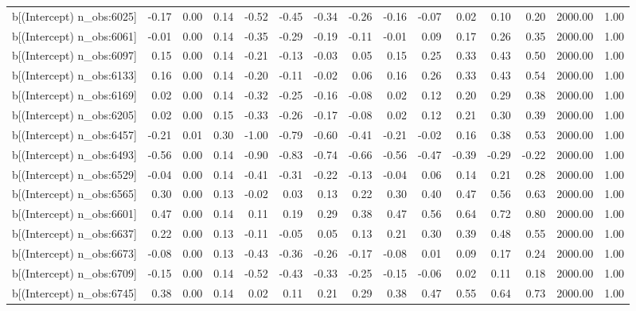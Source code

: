 \begin{table}[ht]
\begin{tabular}{rrrrrrrrrrrrrrr}
  b[(Intercept) n\_obs:6025] & -0.17 & 0.00 & 0.14 & -0.52 & -0.45 & -0.34 & -0.26 & -0.16 & -0.07 & 0.02 & 0.10 & 0.20 & 2000.00 & 1.00 \\ 
  b[(Intercept) n\_obs:6061] & -0.01 & 0.00 & 0.14 & -0.35 & -0.29 & -0.19 & -0.11 & -0.01 & 0.09 & 0.17 & 0.26 & 0.35 & 2000.00 & 1.00 \\ 
  b[(Intercept) n\_obs:6097] & 0.15 & 0.00 & 0.14 & -0.21 & -0.13 & -0.03 & 0.05 & 0.15 & 0.25 & 0.33 & 0.43 & 0.50 & 2000.00 & 1.00 \\ 
  b[(Intercept) n\_obs:6133] & 0.16 & 0.00 & 0.14 & -0.20 & -0.11 & -0.02 & 0.06 & 0.16 & 0.26 & 0.33 & 0.43 & 0.54 & 2000.00 & 1.00 \\ 
  b[(Intercept) n\_obs:6169] & 0.02 & 0.00 & 0.14 & -0.32 & -0.25 & -0.16 & -0.08 & 0.02 & 0.12 & 0.20 & 0.29 & 0.38 & 2000.00 & 1.00 \\ 
  b[(Intercept) n\_obs:6205] & 0.02 & 0.00 & 0.15 & -0.33 & -0.26 & -0.17 & -0.08 & 0.02 & 0.12 & 0.21 & 0.30 & 0.39 & 2000.00 & 1.00 \\ 
  b[(Intercept) n\_obs:6457] & -0.21 & 0.01 & 0.30 & -1.00 & -0.79 & -0.60 & -0.41 & -0.21 & -0.02 & 0.16 & 0.38 & 0.53 & 2000.00 & 1.00 \\ 
  b[(Intercept) n\_obs:6493] & -0.56 & 0.00 & 0.14 & -0.90 & -0.83 & -0.74 & -0.66 & -0.56 & -0.47 & -0.39 & -0.29 & -0.22 & 2000.00 & 1.00 \\ 
  b[(Intercept) n\_obs:6529] & -0.04 & 0.00 & 0.14 & -0.41 & -0.31 & -0.22 & -0.13 & -0.04 & 0.06 & 0.14 & 0.21 & 0.28 & 2000.00 & 1.00 \\ 
  b[(Intercept) n\_obs:6565] & 0.30 & 0.00 & 0.13 & -0.02 & 0.03 & 0.13 & 0.22 & 0.30 & 0.40 & 0.47 & 0.56 & 0.63 & 2000.00 & 1.00 \\ 
  b[(Intercept) n\_obs:6601] & 0.47 & 0.00 & 0.14 & 0.11 & 0.19 & 0.29 & 0.38 & 0.47 & 0.56 & 0.64 & 0.72 & 0.80 & 2000.00 & 1.00 \\ 
  b[(Intercept) n\_obs:6637] & 0.22 & 0.00 & 0.13 & -0.11 & -0.05 & 0.05 & 0.13 & 0.21 & 0.30 & 0.39 & 0.48 & 0.55 & 2000.00 & 1.00 \\ 
  b[(Intercept) n\_obs:6673] & -0.08 & 0.00 & 0.13 & -0.43 & -0.36 & -0.26 & -0.17 & -0.08 & 0.01 & 0.09 & 0.17 & 0.24 & 2000.00 & 1.00 \\ 
  b[(Intercept) n\_obs:6709] & -0.15 & 0.00 & 0.14 & -0.52 & -0.43 & -0.33 & -0.25 & -0.15 & -0.06 & 0.02 & 0.11 & 0.18 & 2000.00 & 1.00 \\ 
  b[(Intercept) n\_obs:6745] & 0.38 & 0.00 & 0.14 & 0.02 & 0.11 & 0.21 & 0.29 & 0.38 & 0.47 & 0.55 & 0.64 & 0.73 & 2000.00 & 1.00 \\ 

\end{tabular}
\end{table}
